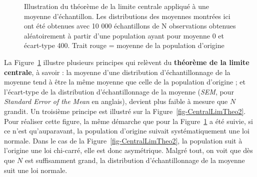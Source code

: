 \documentclass[
  letterpaper,
]{book}
\begin{document}
\begin{figure}


\caption{\label{fig-CentralLimTheo}Illustration du théorème de la limite
centrale appliqué à une moyenne d'échantillon. Les distributions des
moyennes montrées ici ont été obtenues avec 10 000 échantillons de N
observations obtenues aléatoirement à partir d'une population ayant pour
moyenne 0 et écart-type 400. Trait rouge = moyenne de la population
d'origine}

\end{figure}%

La Figure~\ref{fig-CentralLimTheo} illustre plusieurs principes qui
relèvent du \textbf{théorème de la limite centrale}, à savoir : la
moyenne d'une distribution d'échantillonnage de la moyenne tend à être
la même moyenne que celle de la population d'origine ; et l'écart-type
de la distribution d'échantillonnage de la moyenne (\emph{SEM}, pour
\emph{Standard Error of the Mean} en anglais), devient plus faible à
mesure que \(N\) grandit. Un troisième principe est illustré sur la
Figure~\ref{fig-CentralLimTheo2}. Pour réaliser cette figure, la même
démarche que pour la Figure~\ref{fig-CentralLimTheo} a été suivie, si ce
n'est qu'auparavant, la population d'origine suivait systématiquement
une loi normale. Dans le cas de la Figure~\ref{fig-CentralLimTheo2}, la
population suit à l'origine une loi chi-carré, elle est donc
asymétrique. Malgré tout, on voit que dès que \(N\) est suffisamment
grand, la distribution d'échantillonnage de la moyenne suit une loi
normale.
\end{document}
